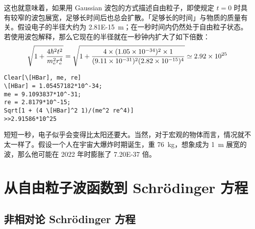 这也就意味着，如果用 Gaussian 波包的方式描述自由粒子，即使规定 $t = 0$ 时具有较窄的波包展宽，足够长时间后也总会扩散。「足够长的时间」与物质的质量有关。假设电子的半径大约为 \SI{2.81E-15}{\metre}；在一秒时间内仍然处于自由粒子状态。若使用波包解释，那么它现在的半径就在一秒钟内扩大了如下倍数：
\begin{equation}
\sqrt{1 + \frac{4 \hbar^2 t^2}{m_\mathrm{e}^2 r_\mathrm{e}^4}} 
= \sqrt{1 + \frac
{4\times(\num{1.05E-34})^2\times1}
{(\num{9.11E-31})^2(\num{2.82E-15})^4}
}
\simeq \num{2.92E25}
\end{equation}
\begin{lstlisting}
Clear[\[HBar], me, re]
\[HBar] = 1.05457182*10^-34;
me = 9.1093837*10^-31;
re = 2.8179*10^-15;
Sqrt[1 + (4 \[HBar]^2 1)/(me^2 re^4)]
>>2.91586*10^25
\end{lstlisting}
短短一秒，电子似乎会变得比太阳还要大。当然，对于宏观的物体而言，情况就不太一样了。假设一个人在宇宙大爆炸时期诞生，重 \SI{76}{\kilo\gram}，想象成为 \SI{1}{\metre} 展宽的波，那么他可能在 2022 年时膨胀了 \num{7.20E-37} 倍。


\section{从自由粒子波函数到 Schr\"odinger 方程}

\subsection{非相对论 Schr\"odinger 方程}

